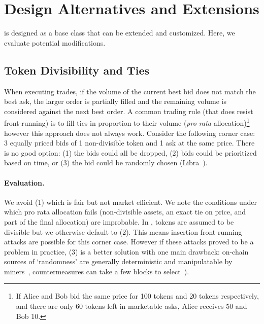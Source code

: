 
\section{Design Alternatives and Extensions}

\cm is designed as a base class that can be extended and customized. Here, we evaluate potential modifications.

\subsection{Token Divisibility and Ties} 

When executing trades, if the volume of the current best bid does not match the best ask, the larger order is partially filled and the remaining volume is considered against the next best order. A common trading rule (that does resist front-running) is to fill ties in proportion to their volume (\ie \textit{pro rata} allocation)\footnote{If Alice and Bob bid the same price for 100 tokens and 20 tokens respectively, and there are only 60 tokens left in marketable asks, Alice receives 50 and Bob 10.} however this approach does not always work. Consider the following corner case: 3 equally priced bids of 1 non-divisible token and 1 ask at the same price. There is no good option: (1) the bids could all be dropped, (2) bids could be prioritized based on time, or (3) the bid could be randomly chosen (\cf Libra~\cite{mavroudis2019libra}). 

\paragraph{Evaluation.} We avoid (1) which is fair but not market efficient. We note the conditions under which pro rata allocation fails (\ie non-divisible assets, an exact tie on price, and part of the final allocation) are improbable. In \cm, tokens are assumed to be divisible but we otherwise default to (2). This means insertion front-running attacks are possible for this corner case. However if these attacks proved to be a problem in practice, (3) is a better solution with one main drawback: on-chain sources of `randomness' are generally deterministic and manipulatable by miners~\cite{bonneau2015random,buenz2017proofs}, countermeasures can take a few blocks to select~\cite{boneh2018verifiable}).


